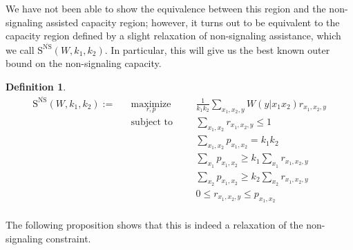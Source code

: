 \documentclass[11pt]{article}
\theoremstyle{definition}
\newtheorem{defi}[theo]{Definition}
\theoremstyle{remark}
\DeclareMathOperator{\maxi}{\text{maximize}}
\DeclareMathOperator{\st}{\text{subject to}}
\begin{document}
We have not been able to show the equivalence between this region and the non-signaling assisted capacity region; however, it turns out to be equivalent to the capacity region defined by a slight relaxation of non-signaling assistance, which we call $\mathrm{S}^{\overline{\mathrm{NS}}}(W,k_1,k_2)$. In particular, this will give us the best known outer bound on the non-signaling capacity.

  \begin{defi}
    \begin{equation}
      \begin{aligned}
        \mathrm{S}^{\overline{\mathrm{NS}}}(W,k_1,k_2) := &&\underset{r,p}{\maxi} &&& \frac{1}{k_1k_2} \sum_{x_1,x_2,y} W(y|x_1x_2)r_{x_1,x_2,y}\\
        &&\st &&& \sum_{x_1,x_2} r_{x_1,x_2,y} \leq 1\\
        &&&&& \sum_{x_1,x_2} p_{x_1,x_2} = k_1k_2\\
        &&&&& \sum_{x_1} p_{x_1,x_2} \geq k_1 \sum_{x_1} r_{x_1,x_2,y}\\
        &&&&& \sum_{x_2} p_{x_1,x_2} \geq k_2 \sum_{x_2} r_{x_1,x_2,y}\\
        &&&&& 0 \leq r_{x_1,x_2,y} \leq p_{x_1,x_2}\\
      \end{aligned}
    \end{equation}
  \end{defi}

The following proposition shows that this is indeed a relaxation of the non-signaling constraint.
\end{document}
